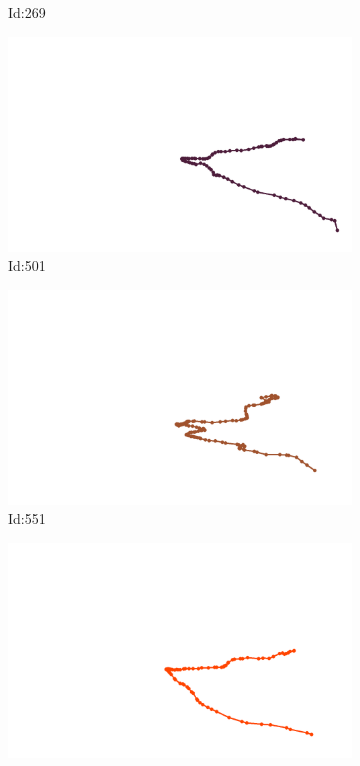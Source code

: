 \documentclass[12pt,twoside]{report}
\begin{document}
\begin{figure}
\begin{subfigure}[b]{0.20\textwidth}
\caption{Id:269}
\end{subfigure}
\begin{subfigure}[b]{0.20\textwidth}
\centering
\includegraphics[width=\textwidth]{../trajectories/501.png}
\caption{Id:501}
\end{subfigure}
\begin{subfigure}[b]{0.20\textwidth}
\centering
\includegraphics[width=\textwidth]{../trajectories/551.png}
\caption{Id:551}
\end{subfigure}
\begin{subfigure}[b]{0.20\textwidth}
\centering
\includegraphics[width=\textwidth]{../trajectories/604.png}

\end{subfigure}
\end{figure}
\end{document}
